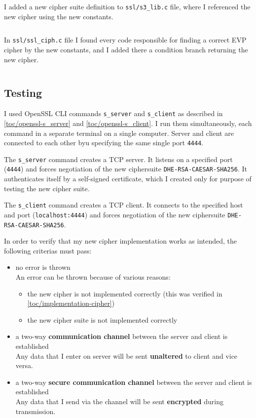 \inputminted{c}{code/openssl/ssl/tls1.h}
\inputminted{c}{code/openssl/ssl/ssl_locl.h}
\inputminted{c}{code/openssl/ssl/t1_trce.c}

I added a new cipher suite definition to \texttt{ssl/s3\_lib.c} file, where I referenced the new cipher using the new constants.

\inputminted{c}{code/openssl/ssl/s3_lib.c}

In \texttt{ssl/ssl\_ciph.c} file I found every code responsible for finding a correct EVP cipher by the new constants, and I added there a condition branch returning the new cipher.

\inputminted{c}{code/openssl/ssl/ssl_ciph.c}

\subsection{Testing}

I used OpenSSL CLI commands \texttt{s\_server} and \texttt{s\_client} as described in \autoref{toc/openssl-s_server} and \autoref{toc/openssl-s_client}. I run them simultaneously, each command in a separate terminal on a single computer. Server and client are connected to each other byu specifying the same single port \texttt{4444}.

The \texttt{s\_server} command creates a TCP server. It listens on a specified port (\texttt{4444}) and forces negotiation of the new ciphersuite \texttt{DHE-RSA-CAESAR-SHA256}. It authenticates itself by a self-signed certificate, which I created only for purpose of testing the new cipher suite.

The \texttt{s\_client} command creates a TCP client. It connects to the specified host and port (\texttt{localhost:4444}) and forces negotiation of the new ciphersuite \texttt{DHE-RSA-CAESAR-SHA256}.

In order to verify that my new cipher implementation works as intended, the following criterias must pass:

\begin{itemize}
  \item no error is thrown \\ An error can be thrown because of various reasons:
  \begin{itemize}
    \item the new cipher is not implemented correctly (this was verified in \autoref{toc/implementation-cipher})
    \item the new cipher suite is not implemented correctly
  \end{itemize}
  \item a two-way \textbf{communication channel} between the server and client is established \\ Any data that I enter on server will be sent \textbf{unaltered} to client and vice versa.
  \item a two-way \textbf{secure communication channel} between the server and client is established \\ Any data that I send via the channel will be sent \textbf{encrypted} during transmission.
\end{itemize}

